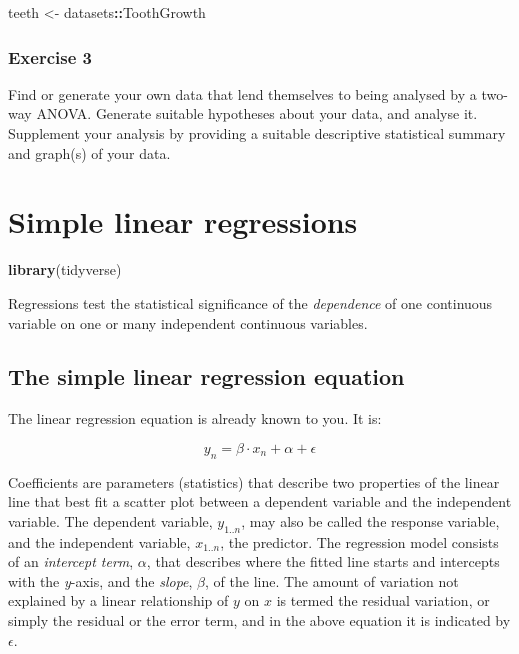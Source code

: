 \documentclass[english,10pt,a4paper,oneside]{book}
\newenvironment{Shaded}{\begin{snugshade}}{\end{snugshade}}
\newcommand{\KeywordTok}[1]{\textcolor[rgb]{0.13,0.29,0.53}{\textbf{#1}}}
\newcommand{\StringTok}[1]{\textcolor[rgb]{0.31,0.60,0.02}{#1}}
\newcommand{\OperatorTok}[1]{\textcolor[rgb]{0.81,0.36,0.00}{\textbf{#1}}}
\newcommand{\NormalTok}[1]{#1}
\theoremstyle{definition}
\theoremstyle{definition}
\theoremstyle{definition}
\theoremstyle{remark}
\begin{document}
\begin{Shaded}
\begin{Highlighting}[]
\NormalTok{teeth <-}\StringTok{ }\NormalTok{datasets}\OperatorTok{::}\NormalTok{ToothGrowth}
\end{Highlighting}
\end{Shaded}

\subsection{Exercise 3}\label{exercise-3}

Find or generate your own data that lend themselves to being analysed by
a two-way ANOVA. Generate suitable hypotheses about your data, and
analyse it. Supplement your analysis by providing a suitable descriptive
statistical summary and graph(s) of your data.

\chapter{Simple linear regressions}\label{simple-linear-regressions}

\begin{Shaded}
\begin{Highlighting}[]
\KeywordTok{library}\NormalTok{(tidyverse)}
\end{Highlighting}
\end{Shaded}

Regressions test the statistical significance of the \emph{dependence}
of one continuous variable on one or many independent continuous
variables.

\section{The simple linear regression
equation}\label{the-simple-linear-regression-equation}

The linear regression equation is already known to you. It is:

\[y_{n}=\beta \cdot x_{n}+\alpha+\epsilon\]

Coefficients are parameters (statistics) that describe two properties of
the linear line that best fit a scatter plot between a dependent
variable and the independent variable. The dependent variable,
\(y_{1..n}\), may also be called the response variable, and the
independent variable, \(x_{1..n}\), the predictor. The regression model
consists of an \emph{intercept term}, \(\alpha\), that describes where
the fitted line starts and intercepts with the \emph{y}-axis, and the
\emph{slope}, \(\beta\), of the line. The amount of variation not
explained by a linear relationship of \(y\) on \(x\) is termed the
residual variation, or simply the residual or the error term, and in the
above equation it is indicated by \(\epsilon\).
\end{document}
